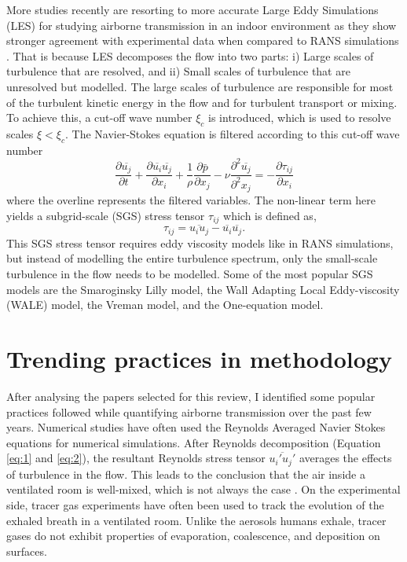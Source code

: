 \documentclass[preprint,12pt]{elsarticle}
\begin{document}
More studies recently are resorting to more accurate Large Eddy Simulations (LES) for studying airborne transmission in an indoor environment \cite{vuorinen2020modelling,feng2020study,khosronejad2020fluid} as they show stronger agreement with experimental data when compared to RANS simulations \cite{wu2023numerical}. That is because LES decomposes the flow into two parts: i) Large scales of turbulence that are resolved, and ii) Small scales of turbulence that are unresolved but modelled. The large scales of turbulence are responsible for most of the turbulent kinetic energy in the flow and for turbulent transport or mixing. To achieve this, a cut-off wave number $\xi_c$ is introduced, which is used to resolve scales $\xi < \xi_c$. The Navier-Stokes equation is filtered according to this cut-off wave number 
\begin{equation}
\frac{\partial \overline{u_j}}{\partial t} + \frac{\partial \overline{u_i}\overline{u_j}}{\partial x_i} + \frac{1}{\rho}\frac{\partial \bar{p}}{\partial x_j} - \nu\frac{\partial^2 \overline{u_j}}{\partial^2 x_j} = -\frac{\partial \tau_{ij}}{\partial x_i}
\label{eq:3}
\end{equation}
where the overline represents the filtered variables. The non-linear term here yields a subgrid-scale (SGS) stress tensor $\tau_{ij}$ which is defined as,
\begin{equation}
\tau_{ij} = \overline{u_iu_j} - \overline{u_i}\overline{u_j}.
\label{eq:4}
\end{equation}
This SGS stress tensor requires eddy viscosity models like in RANS simulations, but instead of modelling the entire turbulence spectrum, only the small-scale turbulence in the flow needs to be modelled. Some of the most popular SGS models are the Smaroginsky Lilly model, the Wall Adapting Local Eddy-viscosity (WALE) model, the Vreman model, and the One-equation model.

\section{Trending practices in methodology}

After analysing the papers selected for this review, I identified some popular practices followed while quantifying airborne transmission over the past few years. Numerical studies have often used the Reynolds Averaged Navier Stokes equations for numerical simulations. After Reynolds decomposition (Equation \ref{eq:1} and \ref{eq:2}), the resultant Reynolds stress tensor $\overline{u_i'u_j'}$ averages the effects of turbulence in the flow. This leads to the conclusion that the air inside a ventilated room is well-mixed, which is not always the case \cite{salinas2022improved}. On the experimental side, tracer gas experiments have often been used to track the evolution of the exhaled breath in a ventilated room. Unlike the aerosols humans exhale, tracer gases do not exhibit properties of evaporation, coalescence, and deposition on surfaces. 
\end{document}
